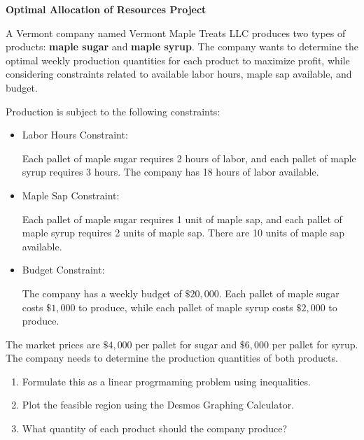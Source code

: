 \documentclass[12pt]{article}
\begin{document}
\begin{large}
\noindent \textbf{Optimal Allocation of Resources Project}
\end{large} \newline





\noindent  A Vermont company named Vermont Maple Treats LLC produces two types of products: \textbf{maple sugar} and \textbf{maple syrup}. The company wants to determine the optimal weekly production quantities for each product to maximize profit, while considering constraints related to available labor hours, maple sap available, and budget.

Production is subject to the following constraints:

\begin{itemize}

	\item Labor Hours Constraint:

Each pallet of maple sugar requires 2 hours of labor, and each pallet of  maple syrup requires 3 hours. The company has 18 hours of labor available.

	\item Maple Sap Constraint:

Each pallet of  maple sugar requires 1 unit of maple sap,  and each pallet of  maple syrup requires 2 units of maple sap.  There are 10 units of maple sap available.

	\item Budget Constraint:

The company has a weekly budget of $\$20,000$.  Each pallet of  maple sugar costs $\$1,000$ to produce, while each pallet of maple syrup costs $\$2,000$ to produce.
\end{itemize}

The market prices are $\$4,000$ per pallet for sugar and $\$6,000$ per pallet for syrup.   The company needs to determine the production quantities of both products.

\begin{enumerate}
	\item Formulate this as a linear progrmaming problem using inequalities.
	\item Plot the feasible region using the Desmos Graphing Calculator.
	\item What quantity of each product should the company produce?
\end{enumerate}
\end{document}
